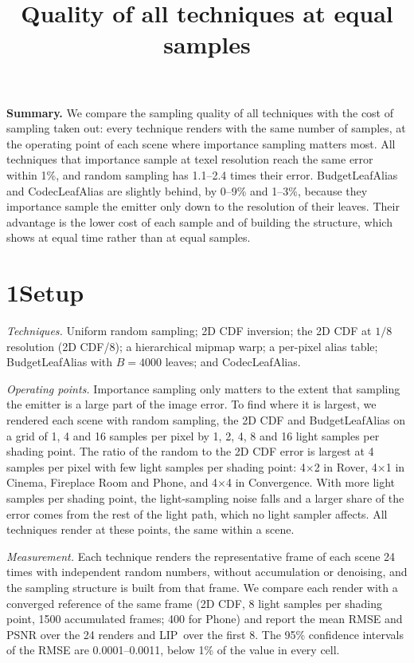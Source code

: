 \documentclass[10pt]{article}
\title{\vspace{-1.6em}Quality of all techniques at equal samples}
\author{}
\date{\vspace{-2.4em}}
\newcommand{\FLIP}{\protect\reflectbox{F}LIP}
\begin{document}
\maketitle
\vspace{-1.0em}

\textbf{Summary.} We compare the sampling quality of all techniques with the cost of sampling taken out: every technique renders with the same number of samples, at the operating point of each scene where importance sampling matters most. All techniques that importance sample at texel resolution reach the same error within 1\%, and random sampling has 1.1--2.4 times their error. BudgetLeafAlias and CodecLeafAlias are slightly behind, by 0--9\% and 1--3\%, because they importance sample the emitter only down to the resolution of their leaves. Their advantage is the lower cost of each sample and of building the structure, which shows at equal time rather than at equal samples.

\section*{1\quad Setup}

\emph{Techniques.} Uniform random sampling; 2D CDF inversion; the 2D CDF at $1/8$ resolution (2D CDF/8); a hierarchical mipmap warp; a per-pixel alias table; BudgetLeafAlias with $B=4000$ leaves; and CodecLeafAlias.

\emph{Operating points.} Importance sampling only matters to the extent that sampling the emitter is a large part of the image error. To find where it is largest, we rendered each scene with random sampling, the 2D CDF and BudgetLeafAlias on a grid of 1, 4 and 16 samples per pixel by 1, 2, 4, 8 and 16 light samples per shading point. The ratio of the random to the 2D CDF error is largest at 4 samples per pixel with few light samples per shading point: 4$\times$2 in Rover, 4$\times$1 in Cinema, Fireplace Room and Phone, and 4$\times$4 in Convergence. With more light samples per shading point, the light-sampling noise falls and a larger share of the error comes from the rest of the light path, which no light sampler affects. All techniques render at these points, the same within a scene.

\emph{Measurement.} Each technique renders the representative frame of each scene 24 times with independent random numbers, without accumulation or denoising, and the sampling structure is built from that frame. We compare each render with a converged reference of the same frame (2D CDF, 8 light samples per shading point, 1500 accumulated frames; 400 for Phone) and report the mean RMSE and PSNR over the 24 renders and \FLIP\ over the first 8. The 95\% confidence intervals of the RMSE are 0.0001--0.0011, below 1\% of the value in every cell.
\end{document}

